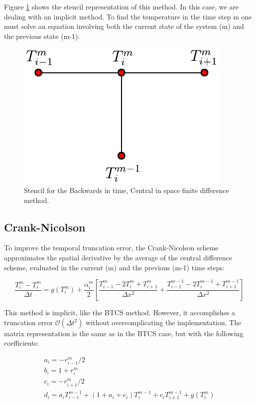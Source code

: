 Figure \ref{fig:StensilBTCS} shows the stencil representation of this method. In this case, we are dealing with an implicit method. To find the temperature in the time step m one must solve an equation involving both the current state of the system (m) and the previous state (m-1). 

\begin{figure}[h]
    \centering
    \includegraphics[width=0.35\columnwidth]{Stencils_FiniteDifferences/BTCS.pdf}
    \caption{Stencil for the Backwards in time, Central in space finite difference method.}
    \label{fig:StensilBTCS}
\end{figure}

\subsection{Crank-Nicolson}

To improve the temporal truncation error, the Crank-Nicolson scheme approximates the spatial derivative by the average of the central difference scheme, evaluated in the current (m) and the previous (m-1) time steps: 

\begin{equation}
    \frac{T^m_i - T^m_i}{\Delta t} = g(T^m_i) + \frac{\alpha^m_i}{2}\left[ 
          \frac{T^m_{i-1}- 2 T^m_i + T_{i+1}^m}{\Delta x^2} + \frac{T^{m-1}_{i-1}-2T^{m-1}_i+T_{i+1}^{m-1}}{\Delta x^2}
    \right] 
\end{equation}

This method is implicit, like the BTCS method. However, it accomplishes a truncation error $\mathcal{O}(\Delta t^2)$ without overcomplicating the implementation. The matrix representation is the same as in the BTCS case, but with the following coefficients:

\begin{equation}
    \begin{gathered}
        a_i = -r^m_{i-1}/2 \\
        b_i = 1 + r^m_{i}\\
        c_i = - r^m_{i+1}/2 \\
        d_i = a_i T_{i-1}^{m-1} + (1 + a_i + c_i) T^{m-1}_{i} + c_i T_{i+1}^{m-1} + g(T_i^m)
    \end{gathered}
\end{equation}

